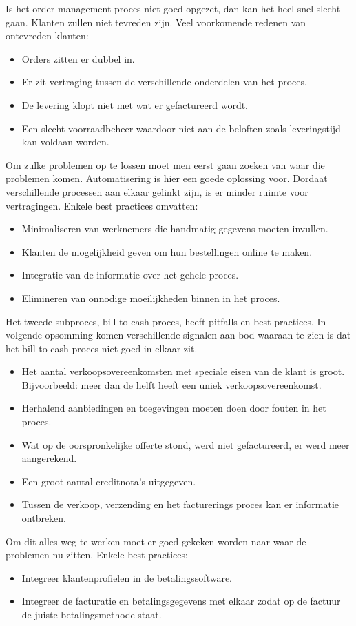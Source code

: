 Is het order management proces niet goed opgezet, dan kan het heel snel slecht gaan. Klanten zullen niet tevreden zijn. 
Veel voorkomende redenen van ontevreden klanten:
\begin{itemize}
	\item Orders zitten er dubbel in.
	\item Er zit vertraging tussen de verschillende onderdelen van het proces.
	\item De levering klopt niet met wat er gefactureerd wordt.
	\item Een slecht voorraadbeheer waardoor niet aan de beloften zoals leveringstijd kan voldaan worden.
\end{itemize}
Om zulke problemen op te lossen moet men eerst gaan zoeken van waar die problemen komen. Automatisering is hier een goede oplossing voor. Dordaat verschillende processen aan elkaar gelinkt zijn, is er minder ruimte voor vertragingen. Enkele best practices omvatten:
\begin{itemize}
	\item Minimaliseren van  werknemers die handmatig gegevens moeten invullen.
	\item Klanten de mogelijkheid geven om hun bestellingen online te maken.
	\item Integratie van de informatie over het gehele proces.
	\item Elimineren van onnodige moeilijkheden binnen in het proces.
\end{itemize}

Het tweede subproces, bill-to-cash proces, heeft pitfalls en best practices.
In volgende opsomming komen verschillende signalen aan bod waaraan te zien is dat het bill-to-cash proces niet goed in elkaar zit.
\begin{itemize}
	\item Het aantal verkoopsovereenkomsten met speciale eisen van de klant is groot. Bijvoorbeeld: meer dan de helft heeft een uniek verkoopsovereenkomst.
	\item Herhalend aanbiedingen en toegevingen moeten doen door fouten in het proces.
	\item Wat op de oorspronkelijke offerte stond,  werd niet gefactureerd, er  werd meer aangerekend.
	\item Een groot aantal creditnota's uitgegeven.
	\item Tussen de verkoop, verzending en het facturerings proces kan er informatie ontbreken.
\end{itemize}
Om dit alles  weg te werken moet er goed gekeken worden naar waar de problemen nu zitten. Enkele best practices:
\begin{itemize}
	\item Integreer klantenprofielen in de betalingssoftware.
	\item Integreer de facturatie en betalingsgegevens met elkaar zodat op de factuur de juiste betalingsmethode staat.
\end{itemize}


